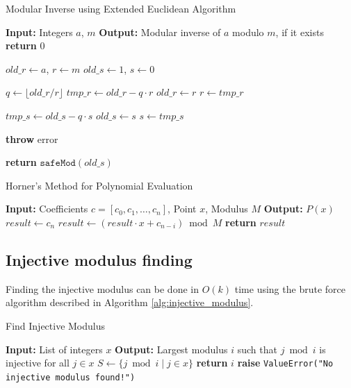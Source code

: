 \documentclass{article}
\theoremstyle{plain}
\theoremstyle{definition}
\theoremstyle{remark}
\begin{document}
\begin{algorithm}[h]
    \caption{Modular Inverse using Extended Euclidean Algorithm}
    \label{alg:mod_inverse}
\begin{algorithmic}[1]
    \STATE \textbf{Input:} Integers $a$, $m$
    \STATE \textbf{Output:} Modular inverse of $a$ modulo $m$, if it exists
        \STATE \textbf{return} $0$ 
    \ENDIF

    \STATE $old\_r \gets a$, $r \gets m$ 
    \STATE $old\_s \gets 1$, $s \gets 0$ 

        \STATE $q \gets \lfloor old\_r / r \rfloor$
        \STATE $tmp\_r \gets old\_r - q \cdot r$
        \STATE $old\_r \gets r$
        \STATE $r \gets tmp\_r$

        \STATE $tmp\_s \gets old\_s - q \cdot s$
        \STATE $old\_s \gets s$
        \STATE $s \gets tmp\_s$
    \ENDWHILE

        \STATE \textbf{throw} error 
    \ENDIF

    \STATE \textbf{return} $\texttt{safeMod}(old\_s)$
\end{algorithmic}
\end{algorithm}

\begin{algorithm}[h]
    \caption{Horner's Method for Polynomial Evaluation}
    \label{alg:horner_eval}
\begin{algorithmic}[1]
    \STATE \textbf{Input:} Coefficients $c = [c_0, c_1, \dots, c_n]$, Point $x$, Modulus $M$
    \STATE \textbf{Output:} $P(x)$
    \STATE $result \gets c_n$
        \STATE $result \gets (result \cdot x + c_{n - i}) \bmod M$
    \ENDFOR
    \STATE \textbf{return} $result$
\end{algorithmic}
\end{algorithm}


\subsection{Injective modulus finding}

Finding the injective modulus can be done in $O(k)$ time using the brute force algorithm described in Algorithm \ref{alg:injective_modulus}.

\begin{algorithm}[h]
    \caption{Find Injective Modulus}
    \label{alg:injective_modulus}
\begin{algorithmic}[1]
    \STATE \textbf{Input:} List of integers $x$
    \STATE \textbf{Output:} Largest modulus $i$ such that $j \bmod i$ is injective for all $j \in x$
        \STATE $S \gets \{ j \bmod i \mid j \in x \}$
            \STATE \textbf{return} $i$
        \ENDIF
    \ENDFOR
    \STATE \textbf{raise} \texttt{ValueError("No injective modulus found!")}
\end{algorithmic}
\end{algorithm}
\end{document}
